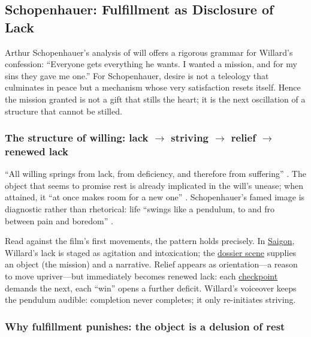 \subsection*{Schopenhauer: Fulfillment as Disclosure of Lack}
\label{ssec:iii-schopenhauer}
Arthur Schopenhauer's analysis of will offers a rigorous grammar for Willard's confession:
``Everyone gets everything he wants. I wanted a mission, and for my sins they gave me one.''
For Schopenhauer, desire is not a teleology that culminates in peace but a mechanism whose
very satisfaction resets itself. Hence the mission granted is not a gift that stills the heart;
it is the next oscillation of a structure that cannot be stilled.

\subsubsection*{The structure of willing: lack $\rightarrow$ striving
	$\rightarrow$ relief $\rightarrow$ renewed lack}

``All willing springs from lack, from deficiency, and therefore from suffering''
\parencite[p.~196]{SchopenhauerWWR1969}. The object that seems to promise rest is already
implicated in the will's unease; when attained, it ``at once makes room for a new one''
\parencite[p.~319]{SchopenhauerWWR1969}. Schopenhauer's famed image is diagnostic rather
than rhetorical: life ``swings like a pendulum, to and fro between pain and boredom''
\parencite[p.~312]{SchopenhauerWWR1969}.

Read against the film's first movements, the pattern holds precisely. In
\hyperref[scene:saigon-opening]{Saigon}, Willard's lack is staged as agitation and
intoxication; the \hyperref[scene:briefing]{dossier scene} supplies an object (the mission)
and a narrative. Relief appears as orientation—a reason to move upriver—but immediately becomes
renewed lack: each \hyperref[scene:upriver-journey]{checkpoint} demands the next, each ``win''
opens a further deficit.
Willard's voiceover keeps the pendulum audible: completion never completes; it only
re-initiates striving.

\subsubsection*{Why fulfillment punishes: the object is a delusion of rest}

